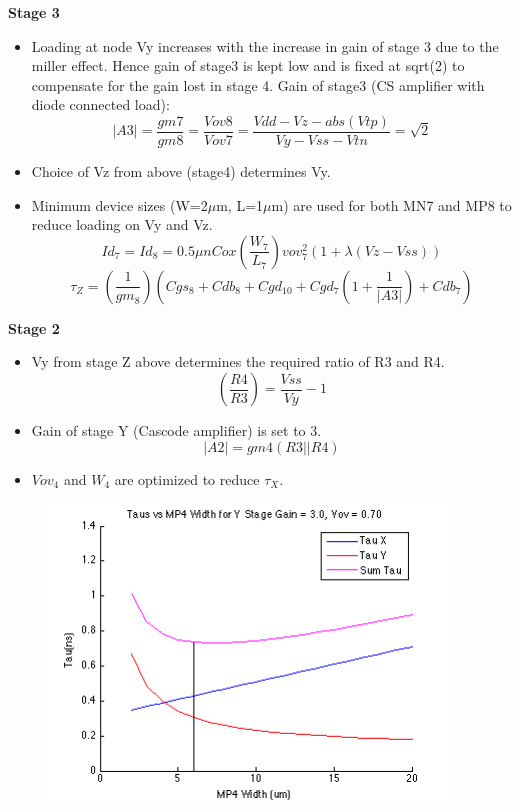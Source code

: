 \documentclass[12pt,a4paper]{article}
\begin{document}
\textbf{Stage 3}

\begin{itemize}
	\item Loading at node Vy increases with the increase in gain of stage 3 due to the miller effect. Hence gain of stage3 is kept low and is fixed at sqrt(2) to compensate for the gain lost in stage 4. Gain of stage3 (CS amplifier with diode connected load):
	\begin{equation}
		|A3|=\frac{gm7}{gm8}=\frac{Vov8}{Vov7}=\frac{Vdd-Vz-abs(Vtp)}{Vy-Vss-Vtn}=\sqrt{2}
	\end{equation}

	\item Choice of Vz from above (stage4) determines Vy.	
	\item Minimum device sizes (W=2$\mu$m, L=1$\mu$m) are used for both MN7 and MP8 to reduce loading on Vy and Vz.
	\begin{equation}
		Id_7=Id_8=0.5\mu nCox(\frac{W_7}{L_7})vov_7^{2} (1+\lambda(Vz-Vss))
	\end{equation}
	\begin{equation}
		\tau_Z=(\frac{1}{gm_8})(Cgs_8+Cdb_8+Cgd_{10}+Cgd_7(1+\frac{1}{|A3|})+Cdb_7)
	\end{equation}
\end{itemize}


\textbf{Stage 2}

\begin{itemize}
	\item Vy from stage Z above determines the required ratio of R3 and R4.
	\begin{equation}
		(\frac{R4}{R3})=\frac{Vss}{Vy}-1
	\end{equation}

	\item Gain of stage Y (Cascode amplifier) is set to 3.
	\begin{equation}
		|A2|=gm4(R3 || R4)
	\end{equation}
	\item $Vov_4$ and $W_{4}$ are optimized to reduce $\tau_X$.
\end{itemize}


\begin{figure}[H]
\centering
\includegraphics[width=10.63cm,height=7.99cm]{tau_x_y_vs_mp4.png}
\end{figure}
\end{document}
